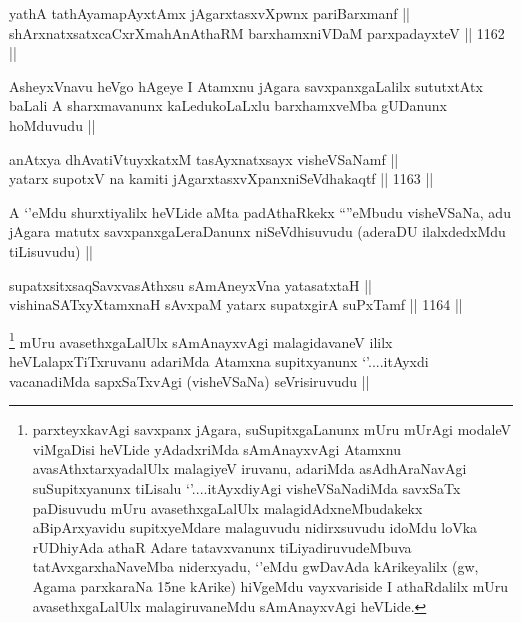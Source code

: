 \begin{shl}
yathA tathA\s yamapAyxtAmx jAgarxtasxvXpwnx pariBarxmanf || \\
shArxnatxsatxcaCxrXmahAnAthaRM barxhamxniVDaM parxpadayxteV ||  1162 ||  
\end{shl}

\begin{artha}
AsheyxVnavu heVgo hAgeye I Atamxnu jAgara savxpanxgaLalilx sututxtAtx baLali A sharxmavanunx kaLedukoLaLxlu barxhamxveMba gUDanunx hoMduvudu ||
\end{artha}


\begin{shl}
anAtxya dhAvatiVtuyxkatxM tasAyxnatxsayx visheVSaNamf || \\
yatarx supotxV na kamiti jAgarxtasxvXpanxniSeVdhakaqtf ||  1163 ||  
\end{shl}

\begin{artha}
A `\stext'eMdu shurxtiyalilx heVLide aMta padAthaRkekx ``\stext''eMbudu visheVSaNa, adu jAgara matutx savxpanxgaLeraDanunx niSeVdhisuvudu (aderaDU ilalxdedxMdu tiLisuvudu) ||
\end{artha}


\begin{shl}
supatxsitxsaqSavxvasAthxsu sAmAneyxVna yatasatxtaH || \\
vishinaSATxyXtamxnaH sAvxpaM yatarx supatxgirA suPxTamf ||  1164 ||  
\end{shl}

\begin{artha}
\footnote{parxteyxkavAgi savxpanx jAgara, suSupitxgaLanunx mUru mUrAgi modaleV viMgaDisi heVLide yAdadxriMda sAmAnayxvAgi Atamxnu avasAthxtarxyadalUlx malagiyeV iruvanu, adariMda asAdhAraNavAgi suSupitxyanunx tiLisalu `\stext'....itAyxdiyAgi visheVSaNadiMda savxSaTx paDisuvudu mUru avasethxgaLalUlx malagidAdxneMbudakekx aBipArxyavidu supitxyeMdare malaguvudu nidirxsuvudu idoMdu loVka rUDhiyAda athaR Adare tatavxvanunx tiLiyadiruvudeMbuva tatAvxgarxhaNaveMba niderxyadu, `\stext'eMdu gwDavAda kArikeyalilx (gw, Agama parxkaraNa 15ne kArike) hiVgeMdu vayxvariside I athaRdalilx mUru avasethxgaLalUlx malagiruvaneMdu sAmAnayxvAgi heVLide.}
mUru avasethxgaLalUlx sAmAnayxvAgi malagidavaneV ililx heVLalapxTiTxruvanu adariMda Atamxna supitxyanunx `\stext'....itAyxdi vacanadiMda sapxSaTxvAgi (visheVSaNa) seVrisiruvudu ||
\end{artha}

